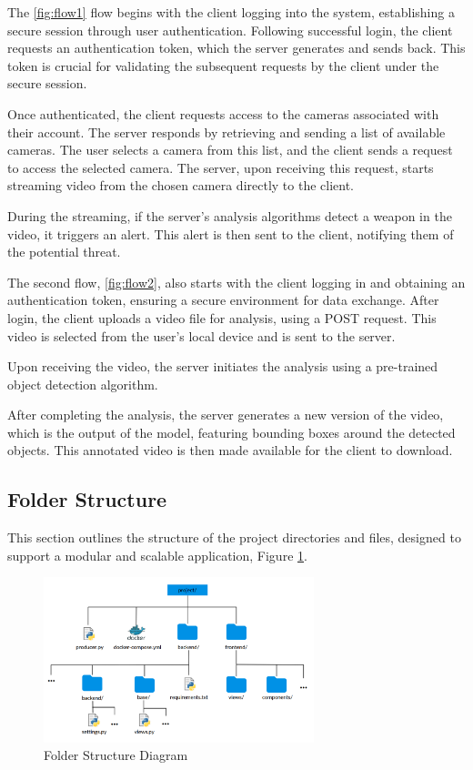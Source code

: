The \ref{fig:flow1} flow begins with the client logging into the system, establishing a secure session 
through user authentication. Following successful login, the client requests an authentication token, which the 
server generates and sends back. This token is crucial for validating the subsequent requests by the client under 
the secure session.

Once authenticated, the client requests access to the cameras associated with their account. The server responds by 
retrieving and sending a list of available cameras. The user selects a camera from this list, and the client sends a 
request to access the selected camera. The server, upon receiving this request, starts streaming video from the chosen 
camera directly to the client.

During the streaming, if the server's analysis algorithms detect a weapon in the video, it triggers an alert. 
This alert is then sent to the client, notifying them of the potential threat.

The second flow, \ref{fig:flow2}, also starts with the client logging in and obtaining an authentication token, ensuring a 
secure environment for data exchange. After login, the client uploads a video file for analysis, using a POST 
request. This video is selected from the user's local device and is sent to the server.

Upon receiving the video, the server initiates the analysis using a pre-trained object detection algorithm. 

After completing the analysis, the server generates a new version of the video, which is the output 
of the model, featuring bounding boxes around the detected objects. This annotated video is then made 
available for the client to download.

\subsection{Folder Structure}
This section outlines the structure of the project directories and files, designed to support a modular and 
scalable application, Figure \ref{fig:folder-structure}.
\begin{figure}[h]
    \centering 
    \includegraphics[width=0.7\textwidth]{figs/folder.png} 
    \caption{Folder Structure Diagram}
    \label{fig:folder-structure}
\end{figure}

